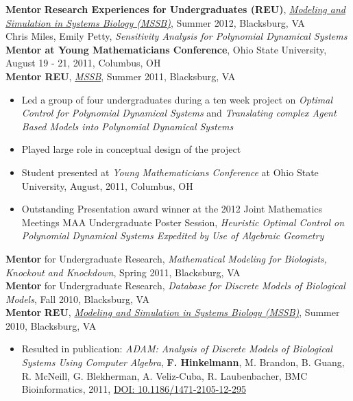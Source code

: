 \documentclass[10pt]{article}
\begin{document}
  \textbf{Mentor} {\bf Research Experiences for Undergraduates (REU)},
    \href{http://biomath.vbi.vt.edu/}{\textit{Modeling and Simulation in Systems
    Biology (MSSB)}}, Summer 2012, Blacksburg, VA\\
    Chris Miles, Emily Petty, {\it Sensitivity Analysis for Polynomial Dynamical Systems}\\

  \textbf{Mentor at Young Mathematicians Conference}, Ohio State University, August 19 - 21, 2011, Columbus, OH\\
  	
  \textbf{Mentor REU},
    \href{http://biomath.vbi.vt.edu/}{\textit{MSSB}}, Summer 2011, Blacksburg, VA
  	\begin{itemize}
  	    \item Led a group of four undergraduates during a ten week project on {\it Optimal Control for Polynomial Dynamical Systems} and {\it Translating complex Agent Based Models into Polynomial Dynamical Systems}
  		\item Played large role in conceptual design of the project
  		\item Student presented at {\it Young Mathematicians Conference} at Ohio State University, August, 2011, Columbus, OH
  		\item Outstanding Presentation award winner at the 2012 Joint Mathematics Meetings MAA
  		Undergraduate Poster Session, {\it Heuristic Optimal Control on
  		Polynomial Dynamical Systems Expedited by Use of Algebraic Geometry} \\
  	  \end{itemize}
  	
   \textbf{Mentor} for Undergraduate Research, \textit{Mathematical Modeling
    for Biologists, Knockout and Knockdown}, Spring 2011, Blacksburg, VA \\

  \textbf{Mentor} for Undergraduate Research, \textit{Database for Discrete Models of Biological Models}, Fall 2010, Blacksburg, VA\\


  	\textbf{Mentor} {\bf REU}, \href{http://biomath.vbi.vt.edu/}{\textit{Modeling and Simulation in Systems Biology (MSSB)}}, Summer 2010, Blacksburg, VA
    \begin{itemize}

      \item Resulted in publication: \textit{ADAM: Analysis of Discrete Models of Biological Systems Using Computer
  	Algebra}, {\bf F. Hinkelmann}, M. Brandon, B. Guang, R. McNeill,
  	G. Blekherman, A. Veliz-Cuba, R. Laubenbacher, BMC Bioinformatics, 2011, \href{http://dx.doi.org/10.1186/1471-2105-12-295}{DOI: 10.1186/1471-2105-12-295}
    \end{itemize}
\end{document}
